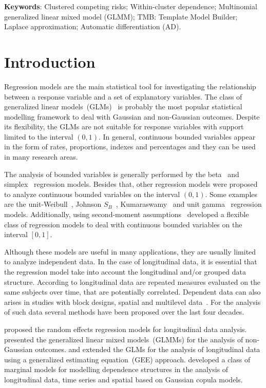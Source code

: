 \documentclass[a4paper,12pt]{article}
\begin{document}
\begin{flushleft}
 \textbf{Keywords}: 
 Clustered competing risks;
 Within-cluster dependence;
 Multinomial generalized linear mixed model (GLMM);
 TMB: Template Model Builder;
 Laplace approximation;
 Automatic differentiation (AD).                    
\end{flushleft}

\section{Introduction}

Regression models are the main statistical tool for investigating the
relationship between a response variable and a set of explanatory
variables. The class of generalized linear models~(GLMs)~\citep{GLM72}
is probably the most popular statistical modelling framework to deal
with Gaussian and non-Gaussian outcomes. Despite its flexibility, the
GLMs are not suitable for response variables with support limited to the
interval \((0, 1)\). In general, continuous bounded variables appear in
the form of rates, proportions, indexes and percentages and they can be
used in many research areas.

The analysis of bounded variables is generally performed by the
beta~\citep{} and simplex~\citep{} regression models. Besides that,
other regression models were proposed to analyze continuous bounded
variables on the interval \((0, 1)\). Some examples are the
unit-Weibull~\citep{}, Johnson \(S_{B}\)~\citep{}, Kumaraswamy~\citep{}
and unit gamma~\citep{} regression models. Additionally, using
second-moment assumptions~\cite{} developed a flexible class of
regression models to deal with continuous bounded variables on the
interval \([0, 1]\).

Although these models are useful in many applications, they are usually
limited to analyze independent data. In the case of longitudinal data,
it is essential that the regression model take into account the
longitudinal and/or grouped data structure. According to \cite{}
longitudinal data are repeated measures evaluated on the same subjects
over time, that are potentially correlated. Dependent data can also
arises in studies with block designs, spatial and multilevel
data~\citep{}. For the analysis of such data several methods have been
proposed over the last four decades.

\cite{} proposed the random effects regression models for longitudinal
data analysis. \cite{} presented the generalized linear mixed
models~(GLMMs) for the analysis of non-Gaussian outcomes. \cite{} and
\cite{} extended the GLMs for the analysis of longitudinal data using a
generalized estimating equation~(GEE) approach. \cite{gcmr} developed a
class of marginal models for modelling dependence structures in the
analysis of longitudinal data, time series and spatial based on Gaussian
copula models.
\end{document}
